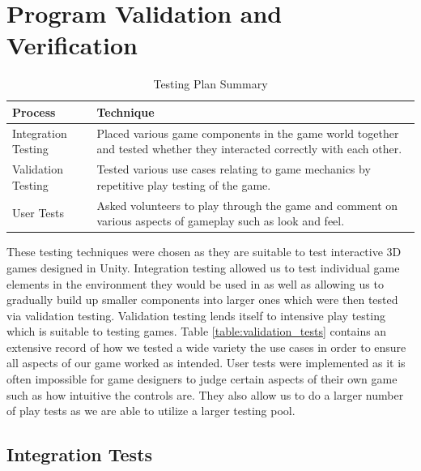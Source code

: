 \documentclass[11pt,a4paper]{article}
\begin{document}
\section{Program Validation and Verification}

\begin{table}[H]
	\begin{center}
		\caption{Testing Plan Summary}
		\begin{tabular}{ |l|p{10cm}| } 
			\hline
			Process & Technique \\ \hline
			Integration Testing & Placed various game components in the game world together and tested whether they interacted correctly with each other. \\ \hline
			Validation Testing & Tested various use cases relating to game mechanics by repetitive play testing of the game. \\ \hline
			User Tests & Asked volunteers to play through the game and comment on various aspects of gameplay such as look and feel.\\
			\hline
		\end{tabular}
	\end{center}    
\end{table}
These testing techniques were chosen as they are suitable to test interactive 3D games designed in Unity. Integration testing allowed us to test individual game elements in the environment they would be used in as well as allowing us to gradually build up smaller components into larger ones which were then tested via validation testing. Validation testing lends itself to intensive play testing which is suitable to testing games. Table \ref{table:validation_tests} contains an extensive record of how we tested a wide variety the use cases in order to ensure all aspects of our game worked as intended. User tests were implemented as it is often impossible for game designers to judge certain aspects of their own game such as how intuitive the controls are. They also allow us to do a larger number of play tests as we are able to utilize a larger testing pool.

\subsection{Integration Tests}
\end{document}
